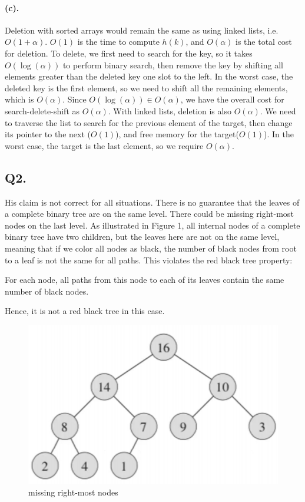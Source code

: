 \documentclass[12pt]{article}
\begin{document}
\paragraph{(c).} Deletion with sorted arrays would remain the same as using linked lists, i.e. \(O(1 +\alpha)\). \(O(1)\) is the time to compute \(h(k)\), and \(O(\alpha)\) is the total cost for deletion. To delete, we first need to search for the key, so it takes \(O(\log(\alpha))\) to perform binary search, then remove the key by shifting all elements greater than the deleted key one slot to the left. In the worst case, the deleted key is the first element, so we need to shift all the remaining elements, which is \(O(\alpha)\). Since \(O(\log(\alpha)) \in O(\alpha)\), we have the overall cost for search-delete-shift as \(O(\alpha)\). With linked lists, deletion is also \(O(\alpha)\). We need to traverse the list to search for the previous element of the target, then change its pointer to the next (\(O(1)\)), and free memory for the target(\(O(1)\)). In the worst case, the target is the last element, so we require \(O(\alpha)\).

\subsection*{Q2.}
His claim is not correct for all situations. There is no guarantee that the leaves of a complete binary tree are on the same level. There could be missing right-most nodes on the last level. As illustrated in Figure 1, all internal nodes of a complete binary tree have two children, but the leaves here are not on the same level, meaning that if we color all nodes as black, the number of black nodes from root to a leaf is not the same for all paths. This violates the red black tree property:
\begin{displayquote}[][]
     For each node, all paths from this node to each of its leaves contain the same number of black nodes.
\end{displayquote}
Hence, it is not a red black tree in this case.
\begin{figure}[H]
     \centering
     \includegraphics[scale =0.8]{q2a.png} 
     \caption{missing right-most nodes}
\end{figure}
\end{document}

